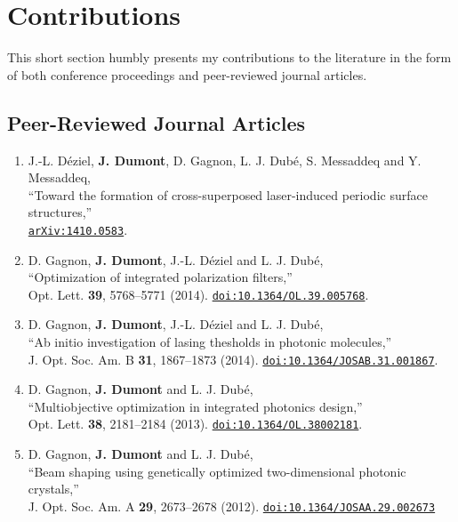 \chapter*{Contributions}
This short section humbly presents my contributions to the 
literature in the form of both conference proceedings and 
peer-reviewed journal articles. 

\section*{Peer-Reviewed Journal Articles}
\renewcommand*{\thefootnote}{\fnsymbol{footnote}}

\begin{enumerate}
  \item[\cite{DEZ2014}] J.-L. Déziel, \textbf{J. Dumont}, D. Gagnon, L. J. Dubé, S. Messaddeq and Y. Messaddeq, \\
  ``Toward the formation of cross-superposed laser-induced periodic surface structures,''\\
  \href{http://arxiv.org/abs/1410.0583}{\texttt{arXiv:1410.0583}}.
  \item[\cite{GAG2014c}] D. Gagnon, \textbf{J. Dumont}, J.-L. Déziel and L. J. Dubé, \\
  ``Optimization of integrated polarization filters,'' \\
  Opt. Lett. \textbf{39}, 5768--5771 (2014). 
  \href{http://dx.doi.org/10.1364/OL.39.005768}{\texttt{doi:10.1364/OL.39.005768}}.
  \item[\cite{GAG2014a}] D. Gagnon, \textbf{J. Dumont}, J.-L. Déziel and L. J. Dubé, \\
	``Ab initio investigation of lasing thesholds in photonic molecules,'' \\ 
	J. Opt. Soc. Am. B \textbf{31}, 1867--1873 (2014).
	\href{http://dx.doi.org/10.1364/JOSAB.31.001867}{\texttt{doi:10.1364/JOSAB.31.001867}}.
  \item[\cite{GAG2013c}]D. Gagnon, \textbf{J. Dumont} and L. J. Dubé, \\
	``Multiobjective optimization in integrated photonics design,''\\
	Opt. Lett. \textbf{38}, 2181--2184 (2013). 
	\href{http://dx.doi.org/10.1364/OL.38002181}{\texttt{doi:10.1364/OL.38002181}}.
  \item[\cite{GAG2012}]D. Gagnon, \textbf{J. Dumont} and L. J. Dubé, \\
	``Beam shaping using genetically optimized two-dimensional photonic crystals,''\\
	J. Opt. Soc. Am. A \textbf{29}, 2673--2678 (2012). 
	\href{http://dx.doi.org/10.1364/JOSAA.29.002673}{\texttt{doi:10.1364/JOSAA.29.002673}}
\end{enumerate}

